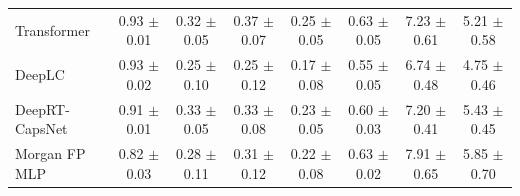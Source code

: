 \begin{table}[htbp]
\begin{tabular}{lccccccc}
    Transformer & 0.93 $\pm$ 0.01 & 0.32 $\pm$ 0.05 & 0.37 $\pm$ 0.07 & 0.25 $\pm$ 0.05 & 0.63 $\pm$ 0.05 & 7.23 $\pm$ 0.61 & 5.21 $\pm$ 0.58 \\
    DeepLC & 0.93 $\pm$ 0.02 & 0.25 $\pm$ 0.10 & 0.25 $\pm$ 0.12 & 0.17 $\pm$ 0.08 & 0.55 $\pm$ 0.05 & 6.74 $\pm$ 0.48 & 4.75 $\pm$ 0.46 \\
    DeepRT-CapsNet & 0.91 $\pm$ 0.01 & 0.33 $\pm$ 0.05 & 0.33 $\pm$ 0.08 & 0.23 $\pm$ 0.05 & 0.60 $\pm$ 0.03 & 7.20 $\pm$ 0.41 & 5.43 $\pm$ 0.45 \\
    Morgan FP MLP & 0.82 $\pm$ 0.03 & 0.28 $\pm$ 0.11 & 0.31 $\pm$ 0.12 & 0.22 $\pm$ 0.08 & 0.63 $\pm$ 0.02 & 7.91 $\pm$ 0.65 & 5.85 $\pm$ 0.70 \\
    \bottomrule
  \end{tabular}
\end{table}
